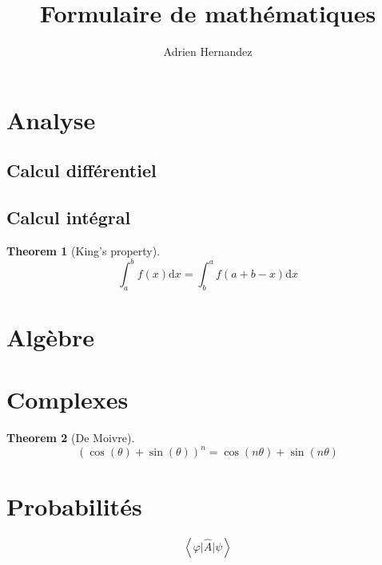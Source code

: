 \documentclass{article}
\title{Formulaire de mathématiques}
\author{Adrien Hernandez}
\date{}
\newtheorem{theorem}{Theorem}
\begin{document}
\maketitle
\section{Analyse}
\subsection{Calcul différentiel}

\subsection{Calcul intégral}
\begin{theorem}[King's property]

    $$ \int_a^b f(x) \mathrm{d}x = \int_b^a f(a+b-x) \mathrm{d}x $$
    
\end{theorem}

\section{Algèbre}

\section{Complexes}
\begin{theorem}[De Moivre]
    $$(\cos(\theta) + \sin(\theta))^n =  \cos(n\theta) + \sin(n\theta)$$
\end{theorem}

\section{Probabilités}

$$ \left\langle \varphi  \vert  \hat{A} \vert  \psi\right\rangle  $$
\end{document}
